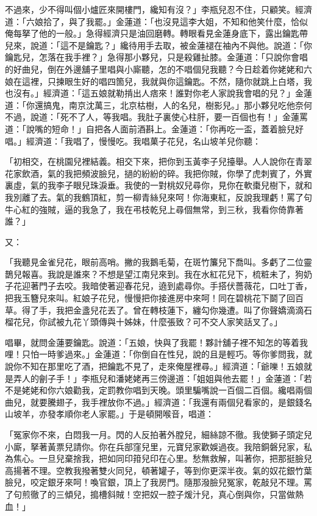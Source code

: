 不過來，少不得叫個小爐匠來開樓門，纔知有沒？」李瓶兒忍不住，只顧笑。經濟道：「六娘拾了，與了我罷。」金蓮道：「也沒見這李大姐，不知和他笑什麼，恰似俺每拏了他的一般。」急得經濟只是油回磨轉。轉眼看見金蓮身底下，露出鑰匙帶兒來，說道：「這不是鑰匙？」纔待用手去取，被金蓮褪在袖內不與他。說道：「你鑰匙兒，怎落在我手裡？」急得那小夥兒，只是殺雞扯膝。金蓮道：「只說你會唱的好曲兒，倒在外邊舖子里唱與小廝聽，怎的不唱個兒我聽？今日趁着你姥姥和六娘在這裡，只揀眼生好的唱四箇兒，我就與你這鑰匙。不然，隨你就跳上白塔，我也沒有。」經濟道：「這五娘就勒掯出人痞來！誰對你老人家說我會唱的兒？」金蓮道：「你還搞鬼，南京沈萬三，北京枯樹，人的名兒，樹影兒。」那小夥兒吃他奈何不過，說道：「死不了人，等我唱。我肚子裏使心柱肝，要一百個也有！」金蓮罵道：「說嘴的短命！」自把各人面前酒斟上。金蓮道：「你再吃一盃，蓋着臉兒好唱。」經濟道：「我唱了，慢慢吃。我唱菓子花兒，名山坡羊兒你聽：

「初相交，在桃園兒裡結義。相交下來，把你到玉黃李子兒擡舉。人人說你在青翠花家飲酒，氣的我把頻波臉兒，撾的紛紛的碎。我把你賊，你學了虎刺賓了，外實裏虛，氣的我李子眼兒珠淚垂。我使的一對桃奴兒尋你，見你在軟棗兒樹下，就和我別離了去。氣的我鶴頂紅，剪一柳青絲兒來呵！你海東紅，反說我理虧！罵了句牛心紅的強賊，逼的我急了，我在弔枝乾兒上尋個無常，到三秋，我看你倚靠著誰？」

又：

「我聽見金雀兒花，眼前高哨。撇的我鵝毛菊，在斑竹簾兒下喬叫。多虧了二位靈鵲兒報喜。我說是誰來？不想是望江南兒來到。我在水紅花兒下，梳粧未了，狗奶子花迎著門子去咬。我暗使著迎春花兒，遶到處尋你。手搭伏薔薇花，口吐丁香，把我玉簪兒來叫。紅娘子花兒，慢慢把你接進房中來呵！同在碧桃花下鬬了回百草。得了手，我把金盞兒花丟了。曾在轉枝蓮下，纏勾你幾遭。叫了你聲嬌滴滴石榴花兒，你試被九花丫頭傳與十姊妹，什麼張致？可不交人家笑話叉了。」

唱畢，就問金蓮要鑰匙。說道：「五娘，快與了我罷！夥計舖子裡不知怎的等着我哩！只怕一時爹過來。」金蓮道：「你倒自在性兒，說的且是輕巧。等你爹問我，就說你不知在那里吃了酒，把鑰匙不見了，走來俺屋裡尋。」經濟道：「爺嚛！五娘就是弄人的劊子手！」李瓶兒和潘姥姥再三傍邊道：「姐姐與他去罷！」金蓮道：「若不是姥姥和你六娘勸我，定罰教你唱到天晚。頭里騙嘴說一百個二百個。纔唱兩個曲兒，就要騰翅子，我手裡放你不過。」經濟道：「我還有兩個兒看家的，是銀錢名山坡羊，亦發孝順你老人家罷。」于是頓開喉音，唱道：

「冤家你不來，白悶我一月。閃的人反拍著外膛兒，細絲諒不徹。我使獅子頭定兒小廝，拏著黃票兒請你。你在兵部窪兒里，元寶兒家歡娛過夜。我陪銅磐兒家，私為焦心。一旦兒棄捨我，把如同印箝兒印在心里。愁無救解，叫著你，把那挺臉兒高揚著不理。空教我撥著雙火同兒，頓著罐子，等到你更深半夜。氣的奴花銀竹葉臉兒，咬定銀牙來呵！喚官銀，頂上了我房門。隨那潑臉兒冤家，乾敲兒不理。罵了句煎徹了的三傾兒，搗槽斜賊！空把奴一腔子煖汁兒，真心倒與你，只當做熱血！」

